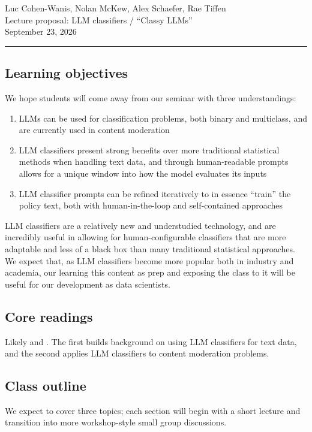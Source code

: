 \documentclass[12pt,notitlepage]{article}
\begin{document}
\begin{flushleft}
    Luc Cohen-Wanis, Nolan McKew, Alex Schaefer, Rae Tiffen \\
    Lecture proposal: LLM classifiers / ``Classy LLMs'' \\
    September 23, 2026
\end{flushleft}
\vspace{-1em}
\rule{\textwidth}{0.4pt}
\vspace{-2em}
\onehalfspacing

\subsection*{Learning objectives}
We hope students will come away from our seminar with three understandings:
\begin{enumerate}
    \item LLMs can be used for classification problems, both binary and multiclass, and are currently used in content moderation
    \item LLM classifiers present strong benefits over more traditional statistical methods when handling text data, and through human-readable prompts allows for a unique window into how the model evaluates its inputs
    \item LLM classifier prompts can be refined iteratively to in essence ``train'' the policy text, both with human-in-the-loop and self-contained approaches
\end{enumerate}

LLM classifiers are a relatively new and understudied technology, and are incredibly useful in allowing for human-configurable classifiers that are more adaptable and less of a black box than many traditional statistical approaches. We expect that, as LLM classifiers become more popular both in industry and academia, our learning this content as prep and exposing the class to it will be useful for our development as data scientists.

\subsection*{Core readings}
Likely \textcite{wangSmartExpertSystem2024} and \textcite{chakrabartiCoPESmallLanguage2025}. The first builds background on using LLM classifiers for text data, and the second applies LLM classifiers to content moderation problems.

\subsection*{Class outline}
We expect to cover three topics; each section will begin with a short lecture and transition into more workshop-style small group discussions.
\end{document}
